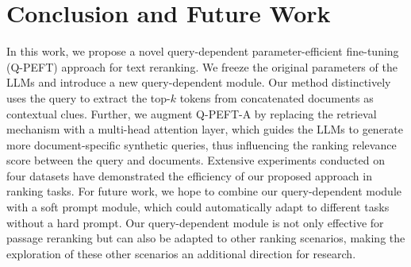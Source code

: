 \documentclass[sigconf,natbib=true,anonymous=false]{acmart}
\begin{document}

\section{Conclusion and Future Work}

In this work, we propose a novel query-dependent parameter-efficient fine-tuning (Q-PEFT) approach for text reranking. We freeze the original parameters of the LLMs and introduce a new query-dependent module. Our method distinctively uses the query to extract the top-$k$ tokens from concatenated documents as contextual clues. Further, we augment Q-PEFT-A by replacing the retrieval mechanism with a multi-head attention layer, which guides the LLMs to generate more document-specific synthetic queries, thus influencing the ranking relevance score between the query and documents. Extensive experiments conducted on four datasets have demonstrated the efficiency of our proposed approach in ranking tasks. For future work, we hope to combine our query-dependent module with a soft prompt module, which could automatically adapt to different tasks without a hard prompt. Our query-dependent module is not only effective for passage reranking but can also be adapted to other ranking scenarios, making the exploration of these other scenarios an additional direction for research.
\end{document}
